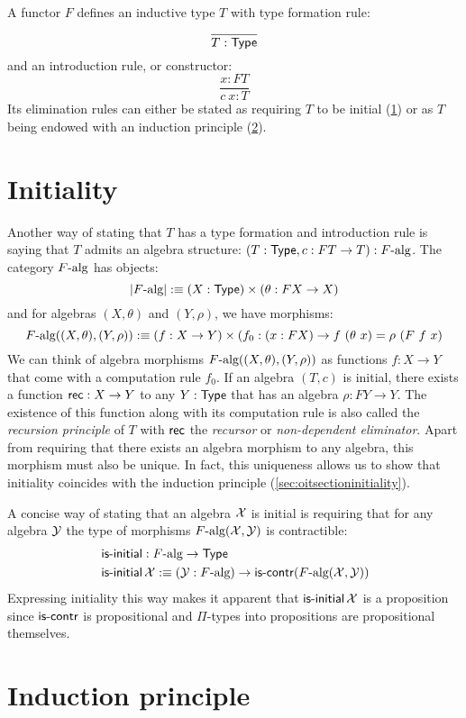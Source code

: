 \documentclass[a4paper,10pt]{report}
\begin{document}
A functor $F$ defines an inductive type $T$ with type formation rule:
$$
\frac{}{T : \mathsf{Type}}
$$
and an introduction rule, or constructor:
$$
\frac{x : FT}{c\ x : T}
$$
Its elimination rules can either be stated as requiring $T$ to be
initial (\cref{sec:oitinitiality}) or as $T$ being endowed with an
induction principle (\cref{sec:oitinduction}).

\section{Initiality}
\label{sec:oitinitiality}

Another way of stating that $T$ has a type formation and introduction
rule is saying that $T$ admits an algebra structure:
$(T : \mathsf{Type} , c : FT \to T) : F\mbox{-alg}$. The category $F\mbox{-alg}$
has objects:
$$
| F\mbox{-alg} | :\equiv (X : \mathsf{Type}) \times (\theta : FX \to X)
$$
and for algebras $(X,\theta)$ and $(Y,\rho)$, we have morphisms:
$$
\algcat{F}((X,\theta),(Y,\rho)) \ddefeq (f : X \to Y) \times (f_0 : (x : FX) \to f\ (\theta\ x) = \rho\ (F\ f\ x)
$$
We can think of algebra morphisms $F\mbox{-alg}((X,\theta),(Y,\rho))$ as
functions $f : X \to Y$ that come with a computation rule $f_0$. If an
algebra $(T,c)$ is initial, there exists a function $\mathsf{rec} : X \to Y$
to any $Y : \mathsf{Type}$ that has an algebra $\rho : FY \to Y$. The
existence of this function along with its computation rule is also
called the \emph{recursion principle} of $T$ with $\mathsf{rec}$ the
\emph{recursor} or \emph{non-dependent eliminator}. Apart from
requiring that there exists an algebra morphism to any algebra, this
morphism must also be unique. In fact, this uniqueness allows us to
show that initiality coincides with the induction principle
(\cref{sec:oitsectioninitiality}).

A concise way of stating that an algebra $\mathcal{X}$ is initial is
requiring that for any algebra $\mathcal{Y}$ the type of morphisms
$F\mbox{-alg}(\mathcal{X},\mathcal{Y})$ is contractible:
%
\begin{align*}
&\operatorname{\mathsf{is-initial}} : F\mbox{-alg} \to \mathsf{Type} \\
&\operatorname{\mathsf{is-initial}} \mathcal{X} :\equiv (\mathcal{Y} : F\mbox{-alg}) \to \operatorname{\mathsf{is-contr}} (F\mbox{-alg}(\mathcal{X},\mathcal{Y}))
\end{align*}
%
Expressing initiality this way makes it apparent that
$\operatorname{\mathsf{is-initial}} \mathcal{X}$ is a proposition since $\operatorname{\mathsf{is-contr}}$ is
propositional and $\Pi$-types into propositions are propositional
themselves.

\section{Induction principle}
\label{sec:oitinduction}
\end{document}
